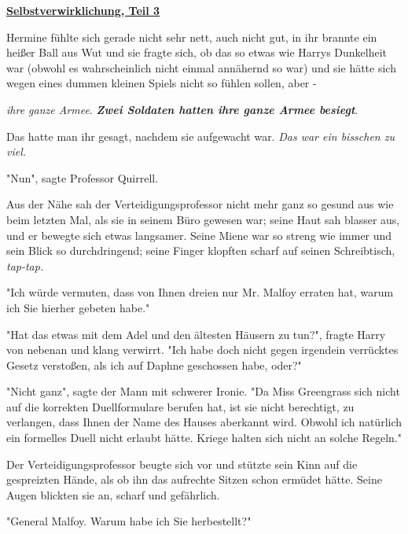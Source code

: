 

\hypertarget{selbstverwirklichung-teil-3}{%

\textbf{\uline{Selbstverwirklichung, Teil 3}}

Hermine fühlte sich gerade nicht sehr nett, auch nicht gut, in ihr brannte ein heißer Ball aus Wut und sie fragte sich, ob das so etwas wie Harrys Dunkelheit war (obwohl es wahrscheinlich nicht einmal annähernd so war) und sie hätte sich wegen eines dummen kleinen Spiels nicht so fühlen sollen, aber -

\emph{ihre ganze Armee}. \textbf{\emph{Zwei Soldaten hatten ihre ganze Armee besiegt}}.

Das hatte man ihr gesagt, nachdem sie aufgewacht war. \emph{Das war ein bisschen zu viel.}

"Nun", sagte Professor Quirrell.

Aus der Nähe sah der Verteidigungsprofessor nicht mehr ganz so gesund aus wie beim letzten Mal, als sie in seinem Büro gewesen war; seine Haut sah blasser aus, und er bewegte sich etwas langsamer. Seine Miene war so streng wie immer und sein Blick so durchdringend; seine Finger klopften scharf auf seinen Schreibtisch, \emph{tap-tap.}

"Ich würde vermuten, dass von Ihnen dreien nur Mr. Malfoy erraten hat, warum ich Sie hierher gebeten habe."

"Hat das etwas mit dem Adel und den ältesten Häusern zu tun?", fragte Harry von nebenan und klang verwirrt. "Ich habe doch nicht gegen irgendein verrücktes Gesetz verstoßen, als ich auf Daphne geschossen habe, oder?"

"Nicht ganz", sagte der Mann mit schwerer Ironie. "Da Miss Greengrass sich nicht auf die korrekten Duellformulare berufen hat, ist sie nicht berechtigt, zu verlangen, dass Ihnen der Name des Hauses aberkannt wird. Obwohl ich natürlich ein formelles Duell nicht erlaubt hätte. Kriege halten sich nicht an solche Regeln."

Der Verteidigungsprofessor beugte sich vor und stützte sein Kinn auf die gespreizten Hände, als ob ihn das aufrechte Sitzen schon ermüdet hätte. Seine Augen blickten sie an, scharf und gefährlich.

"General Malfoy. Warum habe ich Sie herbestellt?"

}
